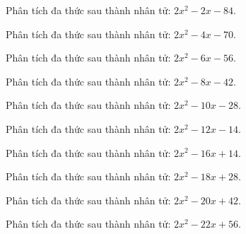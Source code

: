 \begin{bt}
	Phân tích đa thức sau thành nhân tử: $2 x^2 - 2 x - 84$.
\end{bt}
\begin{bt}
	Phân tích đa thức sau thành nhân tử: $2 x^2 - 4 x - 70$.
\end{bt}
\begin{bt}
	Phân tích đa thức sau thành nhân tử: $2 x^2 - 6 x - 56$.
\end{bt}
\begin{bt}
	Phân tích đa thức sau thành nhân tử: $2 x^2 - 8 x - 42$.
\end{bt}
\begin{bt}
	Phân tích đa thức sau thành nhân tử: $2 x^2 - 10 x - 28$.
\end{bt}
\begin{bt}
	Phân tích đa thức sau thành nhân tử: $2 x^2 - 12 x - 14$.
\end{bt}
\begin{bt}
	Phân tích đa thức sau thành nhân tử: $2 x^2 - 16 x + 14$.
\end{bt}
\begin{bt}
	Phân tích đa thức sau thành nhân tử: $2 x^2 - 18 x + 28$.
\end{bt}
\begin{bt}
	Phân tích đa thức sau thành nhân tử: $2 x^2 - 20 x + 42$.
\end{bt}
\begin{bt}
	Phân tích đa thức sau thành nhân tử: $2 x^2 - 22 x + 56$.
\end{bt}
